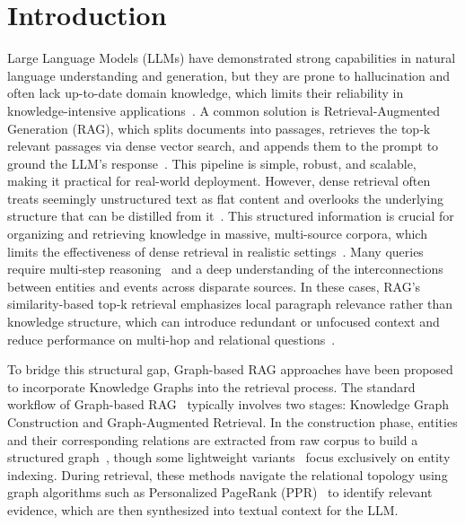 \section{Introduction}
Large Language Models (LLMs) have demonstrated strong capabilities in natural language understanding and generation, but they are prone to hallucination and often lack up-to-date domain knowledge, which limits their reliability in knowledge-intensive applications~\cite{huang2025survey}. A common solution is Retrieval-Augmented Generation (RAG), which splits documents into passages, retrieves the top‑k relevant passages via dense vector search, and appends them to the prompt to ground the LLM’s response~\cite{gao2023retrieval, lewis2020retrieval}. This pipeline is simple, robust, and scalable, making it practical for real-world deployment. However, dense retrieval often treats seemingly unstructured text as flat content and overlooks the underlying structure that can be distilled from it~\cite{han2024retrieval}. This structured information is crucial for organizing and retrieving knowledge in massive, multi-source corpora, which limits the effectiveness of dense retrieval in realistic settings~\cite{peng2024graph}. Many queries require multi-step reasoning~\cite{plaat2025multi} and a deep understanding of the interconnections between entities and events across disparate sources. In these cases, RAG’s similarity-based top‑k retrieval emphasizes local paragraph relevance rather than knowledge structure, which can introduce redundant or unfocused context and reduce performance on multi-hop and relational questions~\cite{zhang2025survey}.

To bridge this structural gap, Graph-based RAG approaches have been proposed to incorporate Knowledge Graphs into the retrieval process. The standard workflow of Graph-based RAG~\cite{gao2023retrieval,zhang2025survey} typically involves two stages: Knowledge Graph Construction and Graph-Augmented Retrieval. In the construction phase, entities and their corresponding relations are extracted from raw corpus to build a structured graph~\cite{edge2024local, jimenez2024hipporag, gutierrez2025rag}, though some lightweight variants~\cite{zhuang2025linearrag} focus exclusively on entity indexing. During retrieval, these methods navigate the relational topology using graph algorithms such as Personalized PageRank (PPR)~\cite{yang2024efficient} to identify relevant evidence, which are then synthesized into textual context for the LLM.

